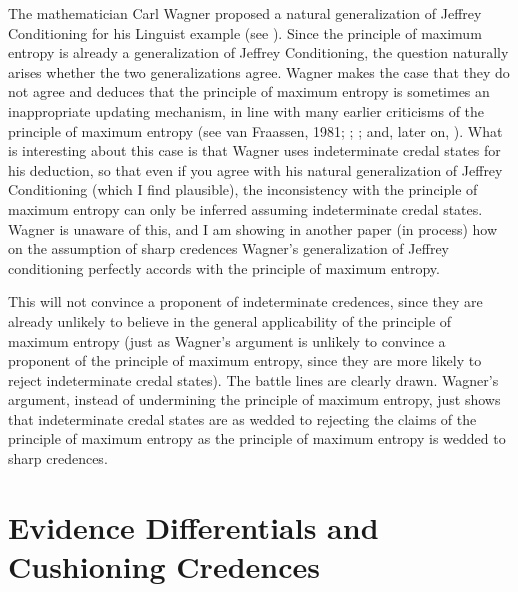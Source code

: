 
The mathematician Carl Wagner proposed a natural
generalization of Jeffrey Conditioning for his Linguist
example (see ). Since the
principle of maximum entropy is already a
generalization of Jeffrey Conditioning, the question
naturally arises whether the two generalizations agree.
Wagner makes the case that they do not agree and
deduces that the principle of maximum entropy is
sometimes an inappropriate updating mechanism, in line
with many earlier criticisms of the principle of
maximum entropy (see van Fraassen, 1981;
; ;
and, later on, ). What is
interesting about this case is that Wagner uses
indeterminate credal states for his deduction, so that
even if you agree with his natural generalization of
Jeffrey Conditioning (which I find plausible), the
inconsistency with the principle of maximum entropy can
only be inferred assuming indeterminate credal states.
Wagner is unaware of this, and I am showing in another
paper (in process) how on the assumption of sharp
credences Wagner's generalization of Jeffrey
conditioning perfectly accords with the principle of
maximum entropy.

This will not convince a proponent of indeterminate
credences, since they are already unlikely to believe
in the general applicability of the principle of
maximum entropy (just as Wagner's argument is unlikely
to convince a proponent of the principle of maximum
entropy, since they are more likely to reject
indeterminate credal states). The battle lines are
clearly drawn. Wagner's argument, instead of
undermining the principle of maximum entropy, just
shows that indeterminate credal states are as wedded to
rejecting the claims of the principle of maximum
entropy as the principle of maximum entropy is wedded
to sharp credences.

\section{Evidence Differentials and Cushioning
  Credences}
\label{WalleysWorldCupWoes}

